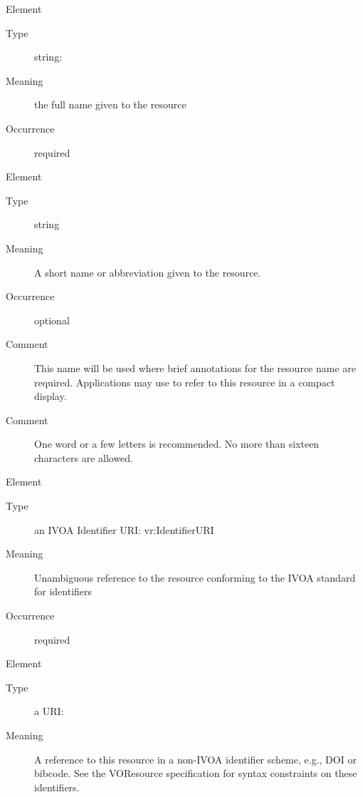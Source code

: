 \documentclass[11pt,a4paper]{ivoa}
\begin{document}
\begin{generated}
\begin{bigdescription}
\begin{description}
\end{description}
\item[Element \xmlel{title}]
\begin{description}
\item[Type] string: 
\item[Meaning]
                  the full name given to the resource

\item[Occurrence] required

\end{description}
\item[Element \xmlel{shortName}]
\begin{description}
\item[Type] string
\item[Meaning]
                 A short name or abbreviation given to the resource.

\item[Occurrence] optional

\item[Comment]
                 This name will be used where brief annotations for
                 the resource name are required.  Applications may
                 use to refer to this resource in a compact display.

\item[Comment]
                 One word or a few letters is recommended.  No more
                 than sixteen characters are allowed.


\end{description}
\item[Element \xmlel{identifier}]
\begin{description}
\item[Type] an IVOA Identifier URI: vr:IdentifierURI
\item[Meaning]
                  Unambiguous reference to the resource conforming to the IVOA
                  standard for identifiers

\item[Occurrence] required


\end{description}
\item[Element \xmlel{altIdentifier}]
\begin{description}
\item[Type] a URI: 
\item[Meaning]
                  A reference to this resource in a non-IVOA identifier
                  scheme, e.g., DOI or bibcode.  See the VOResource
                  specification for syntax constraints on these identifiers.


\end{description}
\end{bigdescription}
\end{generated}
\end{document}
